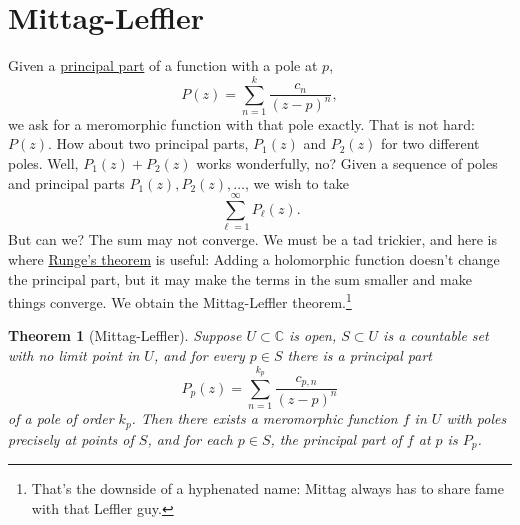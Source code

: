 \documentclass[12pt,openany]{book}
\newcommand{\C}{{\mathbb{C}}}
\theoremstyle{plain}
\newtheorem{thm}{Theorem}[section]
\theoremstyle{remark}
\theoremstyle{definition}
\theoremstyle{exercise}
\theoremstyle{example}
\begin{document}
\section{Mittag-Leffler}
\label{sec:mittaglefler}

Given a \hyperref[defn:principalpart]{principal part} of a function with a pole at $p$,
\begin{equation*}
P(z) = \sum_{n=1}^{k} \frac{c_n}{{(z-p)}^n} ,
\end{equation*}
we ask for a meromorphic function with that pole exactly.  That
is not hard: $P(z)$.  How about two principal parts, $P_1(z)$ and $P_2(z)$
for two different poles.  Well, $P_1(z)+P_2(z)$ works wonderfully, no?
Given a sequence of poles and principal parts
$P_1(z),P_2(z),\ldots$, we wish to take
\begin{equation*}
\sum_{\ell=1}^\infty P_\ell(z) .
\end{equation*}
But can we?  The sum may not converge.  We must be a tad
trickier, and here is where \hyperref[cor:rungeseq]{Runge's theorem} is useful:  Adding
a holomorphic function doesn't change the principal part, but it may make
the terms in the sum smaller and make things converge.
We obtain the
Mittag-Leffler theorem.\footnote{That's the downside of a hyphenated name:
Mittag always has to share fame with that Leffler guy.}

\begin{thm}[Mittag-Leffler]
Suppose $U \subset \C$ is open, $S \subset U$ is a countable set with no
limit point in $U$, and for every $p \in S$ there is a principal part
\begin{equation*}
P_p(z) = \sum_{n=1}^{k_p} \frac{c_{p,n}}{{(z-p)}^n}
\end{equation*}
of a pole of order $k_p$.  Then there exists a meromorphic function $f$ in $U$
with poles precisely at points of $S$, and for each $p \in S$,
the principal part of $f$ at $p$ is $P_p$.
\end{thm}
\end{document}
